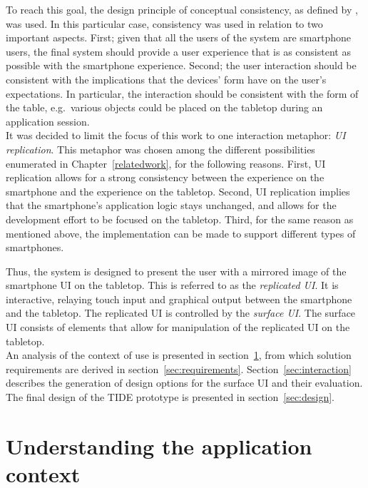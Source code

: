 To reach this goal, the design principle of conceptual consistency, as defined by \cite{Benyon:2010}, was used.
In this particular case, consistency was used in relation to two important aspects.
First; given that all the users of the system are smartphone users, the final system should provide a user experience that is as consistent as possible with the smartphone experience.
Second; the user interaction should be consistent with the implications that the devices' form have on the user's expectations.
In particular, the interaction should be consistent with the form of the table, e.g.\ various objects could be placed on the tabletop during an application session.
\\
\linebreak
It was decided to limit the focus of this work to one interaction metaphor: \emph{UI replication}.
This metaphor was chosen among the different possibilities enumerated in Chapter~\ref{relatedwork}, for the following reasons.
First, UI replication allows for a strong consistency between the experience on the smartphone and the experience on the tabletop.
Second, UI replication implies that the smartphone's application logic stays unchanged, and allows for the development effort to be focused on the tabletop.
Third, for the same reason as mentioned above, the implementation can be made to support different types of smartphones.

Thus, the system is designed to present the user with a mirrored image of the smartphone UI on the tabletop.
This is referred to as the \emph{replicated UI}.
It is interactive, relaying touch input and graphical output between the smartphone and the tabletop.
The replicated UI is controlled by the \emph{surface UI}.
The surface UI consists of elements that allow for manipulation of the replicated UI on the tabletop.
\\
\linebreak
An analysis of the context of use is presented in section~\ref{sec:context}, from which solution requirements are derived in section~\ref{sec:requirements}.
Section~\ref{sec:interaction} describes the generation of design options for the surface UI and their evaluation.
The final design of the TIDE prototype is presented in section~\ref{sec:design}.

\section{Understanding the application context}
\label{sec:context}

